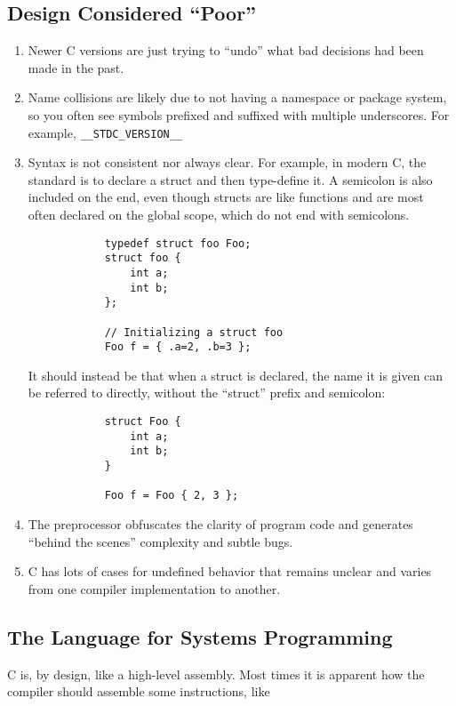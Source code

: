 \documentclass{article}
\begin{document}
\subsection*{Design Considered ``Poor''}
    \begin{enumerate}
        \item Newer C versions are just trying to ``undo'' what bad decisions had been made in the past.
        \item Name collisions are likely due to not having a namespace or package system, so you often see symbols prefixed and suffixed with multiple underscores. For example, \lstinline{__STDC_VERSION__}
        \item Syntax is not consistent nor always clear. For example, in modern C, the standard is to declare a struct and then type-define it. A semicolon is also included on the end, even though structs are like functions and are most often declared on the global scope, which do not end with semicolons.
        \begin{lstlisting}
            typedef struct foo Foo;
            struct foo {
                int a;
                int b;
            };
            
            // Initializing a struct foo
            Foo f = { .a=2, .b=3 };
        \end{lstlisting}
        It should instead be that when a struct is declared, the name it is given can be referred to directly, without the ``struct'' prefix and semicolon:
        \begin{lstlisting}
            struct Foo {
                int a;
                int b;
            }
            
            Foo f = Foo { 2, 3 };
        \end{lstlisting}
        \item The preprocessor obfuscates the clarity of program code and generates ``behind the scenes'' complexity and subtle bugs.
        \item C has lots of cases for undefined behavior that remains unclear and varies from one compiler implementation to another.
    \end{enumerate}
\subsection{The Language for Systems Programming}
    C is, by design, like a high-level assembly. Most times it is apparent how the compiler should assemble some instructions, like 
\end{document}
